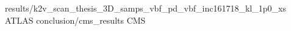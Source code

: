 {results/k2v_scan_thesis_3D_samps_vbf_pd_vbf_inc161718_kl_1p0_xs}
{ATLAS}
{conclusion/cms_results}
{CMS}
